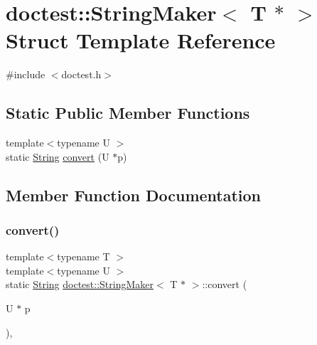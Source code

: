 \hypertarget{structdoctest_1_1_string_maker_3_01_t_01_5_01_4}{}\section{doctest\+:\+:String\+Maker$<$ T $\ast$ $>$ Struct Template Reference}
\label{structdoctest_1_1_string_maker_3_01_t_01_5_01_4}


{\ttfamily \#include $<$doctest.\+h$>$}

\subsection*{Static Public Member Functions}
\begin{DoxyCompactItemize}
\item 
{\footnotesize template$<$typename U $>$ }\\static \hyperlink{classdoctest_1_1_string}{String} \hyperlink{structdoctest_1_1_string_maker_3_01_t_01_5_01_4_a79dfd2e72f48a1d9941b924d6ac23104}{convert} (U $\ast$p)
\end{DoxyCompactItemize}


\subsection{Member Function Documentation}
\mbox{\label{structdoctest_1_1_string_maker_3_01_t_01_5_01_4_a79dfd2e72f48a1d9941b924d6ac23104}} 
\subsubsection{\texorpdfstring{convert()}{convert()}}
{\footnotesize\ttfamily template$<$typename T $>$ \\
template$<$typename U $>$ \\
static \hyperlink{classdoctest_1_1_string}{String} \hyperlink{structdoctest_1_1_string_maker}{doctest\+::\+String\+Maker}$<$ T $\ast$ $>$\+::convert (\begin{DoxyParamCaption}\item[{U $\ast$}]{p }\end{DoxyParamCaption})\hspace{0.3cm}{\ttfamily [inline]}, {\ttfamily [static]}}

